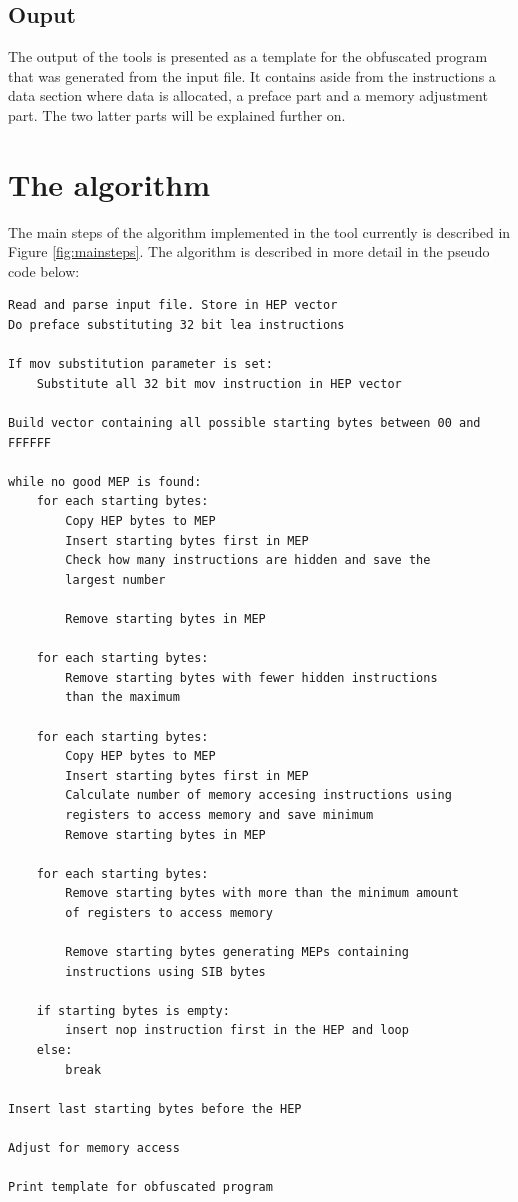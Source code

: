 \documentclass[11pt,twoside]{eitExjobb}
\begin{document}
\subsection{Ouput}
The output of the tools is presented as a template for the obfuscated program that was generated from the input file. It contains aside from the instructions a data section where data is allocated, a preface part and a memory adjustment part. The two latter parts will be explained further on.

\section{The algorithm}
The main steps of the algorithm implemented in the tool currently is described in Figure \ref{fig:mainsteps}. The algorithm is described in more detail in the pseudo code below:

\begin{Verbatim}[fontsize=\tiny]
Read and parse input file. Store in HEP vector
Do preface substituting 32 bit lea instructions

If mov substitution parameter is set:
	Substitute all 32 bit mov instruction in HEP vector

Build vector containing all possible starting bytes between 00 and FFFFFF

while no good MEP is found:
	for each starting bytes:
		Copy HEP bytes to MEP
		Insert starting bytes first in MEP
		Check how many instructions are hidden and save the 
		largest number

		Remove starting bytes in MEP

	for each starting bytes:
		Remove starting bytes with fewer hidden instructions 
		than the maximum

	for each starting bytes:
		Copy HEP bytes to MEP
		Insert starting bytes first in MEP
		Calculate number of memory accesing instructions using
		registers to access memory and save minimum
		Remove starting bytes in MEP

	for each starting bytes:
		Remove starting bytes with more than the minimum amount
		of registers to access memory 

		Remove starting bytes generating MEPs containing 
		instructions using SIB bytes

	if starting bytes is empty:
		insert nop instruction first in the HEP and loop
	else:
		break 

Insert last starting bytes before the HEP

Adjust for memory access

Print template for obfuscated program

\end{Verbatim}
\end{document}
